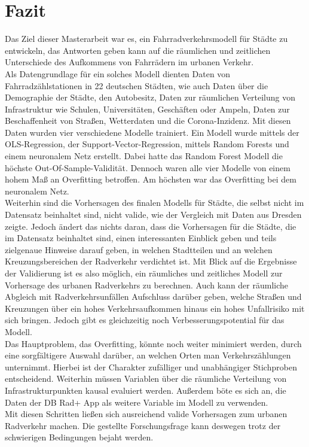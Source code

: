 \documentclass[a4paper,12pt]{thesis}
\begin{document}
\section{Fazit}

Das Ziel dieser Masterarbeit war es, ein Fahrradverkehrsmodell für Städte zu entwickeln, das Antworten geben kann auf die räumlichen und zeitlichen Unterschiede des Aufkommens von Fahrrädern im urbanen Verkehr.\\
Als Datengrundlage für ein solches Modell dienten Daten von Fahrradzählstationen in 22 deutschen Städten, wie auch Daten über die Demographie der Städte, den Autobesitz, Daten zur räumlichen Verteilung von Infrastruktur wie Schulen, Universitäten, Geschäften oder Ampeln, Daten zur Beschaffenheit von Straßen, Wetterdaten und die Corona-Inzidenz. Mit diesen Daten wurden vier verschiedene Modelle trainiert. Ein Modell wurde mittels der OLS-Regression, der Support-Vector-Regression, mittels Random Forests und einem neuronalem Netz erstellt. Dabei hatte das Random Forest Modell die höchste Out-Of-Sample-Validität. Dennoch waren alle vier Modelle von einem hohem Maß an Overfitting betroffen. Am höchsten war das Overfitting bei dem neuronalem Netz.\\
Weiterhin sind die Vorhersagen des finalen Modells für Städte, die selbst nicht im Datensatz beinhaltet sind, nicht valide, wie der Vergleich mit Daten aus Dresden zeigte. Jedoch ändert das nichts daran, dass die Vorhersagen für die Städte, die im Datensatz beinhaltet sind, einen interessanten Einblick geben und teils zielgenaue Hinweise darauf geben, in welchen Stadtteilen und an welchen Kreuzungsbereichen der Radverkehr verdichtet ist. Mit Blick auf die Ergebnisse der Validierung ist es also möglich, ein räumliches und zeitliches Modell zur Vorhersage des urbanen Radverkehrs zu berechnen. Auch kann der räumliche Abgleich mit Radverkehrsunfällen Aufschluss darüber geben, welche Straßen und Kreuzungen über ein hohes Verkehrsaufkommen hinaus ein hohes Unfallrisiko mit sich bringen. Jedoch gibt es gleichzeitig noch Verbesserungspotential für das Modell.\\
Das Hauptproblem, das Overfitting, könnte noch weiter minimiert werden, durch eine sorgfältigere Auswahl darüber, an welchen Orten man Verkehrszählungen unternimmt. Hierbei ist der Charakter zufälliger und unabhängiger Stichproben entscheidend. Weiterhin müssen Variablen über die räumliche Verteilung von Infrastrukturpunkten kausal evaluiert werden. Außerdem böte es sich an, die Daten der DB Rad+ App als weitere Variable im Modell zu verwenden.\\
Mit diesen Schritten ließen sich ausreichend valide Vorhersagen zum urbanen Radverkehr machen. Die gestellte Forschungsfrage kann deswegen trotz der schwierigen Bedingungen bejaht werden.
\end{document}
